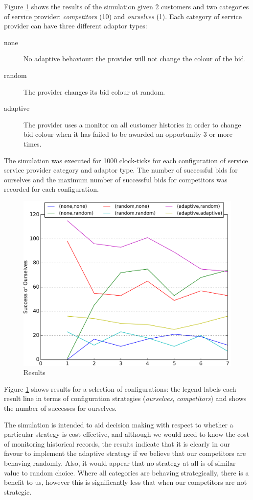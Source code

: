 \documentclass[10pt,numbers]{sigplanconf}
\begin{document}
\label{sec:results}
Figure \ref{fig:results} shows the results of the simulation given 2 customers and two categories of service provider: {\it competitors} (10) and {\it ourselves} (1). Each category of service provider can have three different adaptor types:
\begin{description}
\item[none] No adaptive behaviour: the provider will not change the colour of the bid.
\item[random] The provider changes its bid colour at random.
\item[adaptive] The provider uses a monitor on all customer histories in order to change bid colour when it has failed to be awarded an opportunity 3 or more times.
\end{description}
The simulation was executed for 1000 clock-ticks for each configuration of service service provider category and adaptor type. The number of successful bids for ourselves and the maximum number of successful bids for competitors was recorded for each configuration. 
%
\begin{figure}[t]
\centering
\includegraphics[width=\columnwidth]{sample}
\caption{Results}
\label{fig:results}
\end{figure}
%
%
Figure \ref{fig:results} shows results for a selection of configurations: the legend labels each result line in terms of configuration strategies ({\it ourselves}, {\it competitors}) and shows the number of successes for ourselves. 

The simulation is intended to aid decision making with respect to whether a particular strategy is cost effective, and although we would need to know the cost of monitoring historical records, the results indicate that it is clearly in our favour to implement the adaptive strategy if we believe that our competitors are behaving randomly. Also, it would appear that no strategy at all is of similar value to random choice. Where all categories are behaving strategically, there is a benefit to us, however this is significantly less that when our competitors are not strategic.
\end{document}
